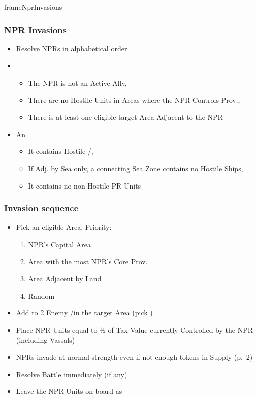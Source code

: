 \documentclass[10pt]{article}
\newlength{\fhNprInvasions} \setlength\fhNprInvasions{29.5\baselineskip}
\begin{document}
\addbackground
\addfooter

\begin{dynamiccontents*}{frameNprInvasions}\begin{eubox}{\fhNprInvasions}
	\subsubsection*{NPR Invasions }
	\begin{itemize}
		\item Resolve NPRs in alphabetical order
		\item {}
		\begin{itemize}
			\item The NPR is not an Active Ally, 
			\item There are no Hostile Units in Areas where the NPR Controls Prov., 
			\item There is at least one eligible target Area Adjacent to the NPR
		\end{itemize}
		\item An 
		\begin{itemize}
			\item It contains Hostile \towns/\vassals, 
			\item If Adj. by Sea only, a connecting Sea Zone contains no Hostile Ships, 
			\item It contains no non-Hostile PR Units
		\end{itemize}
	\end{itemize}
	\subsubsection*{Invasion sequence}
	\begin{itemize}
		\item Pick an eligible Area. Priority:
		\begin{enumerate}
			\item NPR's Capital Area
			\item Area with the most NPR's Core Prov.
			\item Area Adjacent by Land
			\item Random
		\end{enumerate}
		\item Add \unrest to 2 Enemy \towns/\vassals in the target Area (pick \az)
		\item Place NPR Units equal to ½ of Tax Value currently Controlled by the NPR (including Vassals)
		\item NPRs invade at normal strength even if not enough tokens in Supply (p.~2)
		\item Resolve Battle immediately (if any)
		\begin{itemize}
		\end{itemize}
		\item Leave the NPR Units on board as \rebels
	\end{itemize}
\end{eubox}\end{dynamiccontents*}
\end{document}
